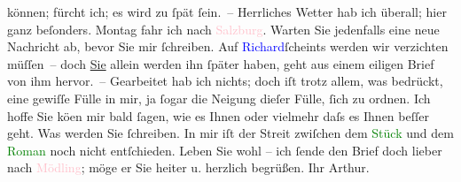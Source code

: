                     können; fürcht ich; es wird zu ſpät ſein. –\pend
           \pstart
           Herrliches Wetter hab ich überall; hier ganz beſonders. Montag fahr
                    ich nach \textcolor{pink}{Salzburg}{}\ledrightnote{\textcolor{pink}{Salzburg}}. Warten Sie {\pb}jedenfalls eine neue Nachricht ab, bevor Sie mir
                    ſchreiben. Auf \textcolor{blue}{Richard}{}\ledrightnote{\textcolor{blue}{Richard Beer-Hofmann}}{ }ſcheints werden wir verzichten müſſen – doch
                        \uline{Sie}{ }\introOben{}allein\introOben{} werden ihn ſpäter haben, geht aus einem eiligen
                    Brief von ihm hervor. –\pend
           \pstart
           Gearbeitet hab ich nichts; doch iſt trotz allem, was bedrückt, eine gewiſſe Fülle
                    in mir, ja ſogar die Neigung dieſer Fülle, ſich zu {\pb}ordnen.\pend
           \pstart
           Ich hoffe Sie kö{\geminationn}en mir bald ſagen, wie es Ihnen
                        \introOben{}oder vielmehr\introOben{} daſs es Ihnen beſſer geht. Was werden
                    Sie ſchreiben. In mir iſt der Streit zwiſchen dem \textcolor{green}{Stück}{} und dem \textcolor{green}{Roman}{} noch nicht entſchieden.\pend
           \pstart
           Leben Sie wohl – ich ſende den Brief doch lieber nach \textcolor{pink}{Mödling}{}\ledrightnote{\textcolor{pink}{Mödling}}; möge er Sie heiter u. herzlich begrüßen.\pend
           \pstart Ihr \spacefill\mbox{Arthur.}\pend{}\endnumbering{}  
      